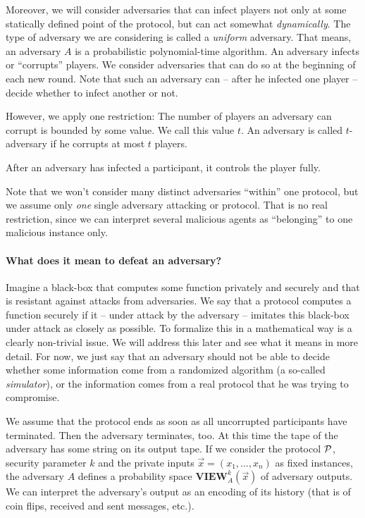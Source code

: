 \message{ !name(seminar.tex)}\documentclass{llncs}
\begin{document}
Moreover, we will consider adversaries that can infect players not only at some statically defined point of the protocol, but can act somewhat \emph{dynamically}. The type of adversary we are considering is called a \emph{uniform} adversary. That means, an adversary $A$ is a probabilistic polynomial-time algorithm. An adversary infects or ``corrupts'' players. We consider adversaries that can do so at the beginning of each new round. Note that such an adversary can -- after he infected one player -- decide whether to infect another or not.

However, we apply one restriction: The number of players an adversary can corrupt is bounded by some value. We call this value $t$. An adversary is called $t$-adversary if he corrupts at most $t$ players.


After an adversary has infected a participant, it controls the player fully.

Note that we won't consider many distinct adversaries ``within'' one protocol, but we assume only \emph{one} single adversary attacking or protocol. That is no real restriction, since we can interpret several malicious agents as ``belonging'' to one malicious instance only.

\paragraph{What does it mean to defeat an adversary?}

Imagine a black-box that computes some function privately and securely and that is resistant against attacks from adversaries. We say that a protocol computes a function securely if it -- under attack by the adversary -- imitates this black-box under attack as closely as possible. To formalize this in a mathematical way is a clearly non-trivial issue. We will address this later and see what it means in more detail. For now, we just say that an adversary should not be able to decide whether some information come from a randomized algorithm (a so-called \emph{simulator}), or the information comes from a real protocol that he was trying to compromise.

We assume that the protocol ends as soon as all uncorrupted participants have terminated. Then the adversary terminates, too. At this time the tape of the adversary has some string on its output tape. If we consider the protocol ${\cal P}$, security parameter $k$ and the private inputs $\overrightarrow{x}=(x_1,\dots,x_n)$ as fixed instances, the adversary $A$ defines a probability space $\mathbf{VIEW}_A^k(\overrightarrow{x})$ of adversary outputs. We can interpret the adversary's output as an encoding of its history (that is of coin flips, received and sent messages, etc.).
\end{document}
